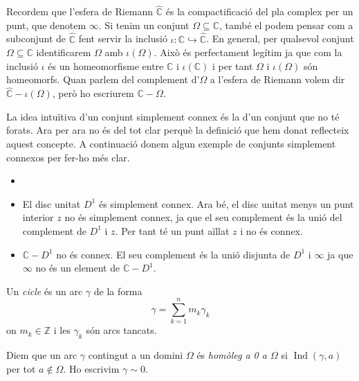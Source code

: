 \documentclass[12pt,twoside]{report}
\numberwithin{table}{section}
\numberwithin{equation}{section}
\numberwithin{figure}{section}
\newcommand{\Z}{\ensuremath{\mathbb{Z}}}
\newcommand{\C}{\ensuremath{\mathbb{C}}}
\newcommand{\Ci}{\ensuremath{\hat{\mathbb{C}}}}
\DeclareMathOperator{\Ind}{Ind}
\begin{document}
Recordem que l'esfera de Riemann \( \Ci \) és la compactificació del pla complex per un punt, que denotem \( \infty \). Si tenim un conjunt \( \Omega \subseteq \C \), també el podem pensar com a subconjunt de \( \Ci \) fent servir la inclusió \( \iota \colon \C \hookrightarrow \Ci \). En general, per qualsevol conjunt \( \Omega \subseteq \C \) identificarem \( \Omega \) amb \( \iota(\Omega) \). Això és perfectament legítim ja que com la inclusió \( \iota \) és un homeomorfisme entre \( \C \) i \( \iota(\C) \) i per tant \( \Omega \) i \( \iota(\Omega) \) són homeomorfs. Quan parlem del complement d'\( \Omega \) a l'esfera de Riemann volem dir \( \Ci - \iota(\Omega) \), però ho escriurem \( \C - \Omega \).

La idea intuïtiva d'un conjunt simplement connex és la d'un conjunt que no té forats. Ara per ara no és del tot clar perquè la definició que hem donat reflecteix aquest concepte. A continuació donem algun exemple de conjunts simplement connexos per fer-ho més clar.
\begin{exe}
	\begin{itemize}
		\item[]
		\item El disc unitat \( D^1 \) és simplement connex. Ara bé, el disc unitat menys un punt interior \( z \) no és simplement connex, ja que el seu complement és la unió del complement de \( D^1 \) i \( z \). Per tant té un punt aïllat \( z \) i no és connex.
		\item	\( \C - D^1 \) no és connex. El seu complement és la unió disjunta de \( D^1 \) i \( \infty \) ja que \( \infty \) no és un element de \( \C - D^1 \). 
	\end{itemize}
\end{exe}

\begin{defn}[Cicle]
	Un \emph{cicle} és un arc \( \gamma \) de la forma 
	\begin{equation*}
		\gamma = \sum_{k = 1}^{n} m_k \gamma_k
	\end{equation*}
	on \( m_k \in \Z \) i les \( \gamma_k \) són arcs tancats.
\end{defn}

\begin{defn}
	Diem que un arc \( \gamma \) contingut a un domini \( \Omega \) és \emph{homòleg a 0 a \( \Omega \)} si \( \Ind(\gamma, a) \) per tot \( a \notin \Omega \). Ho escrivim \( \gamma \sim 0 \). 
\end{defn}
\end{document}
